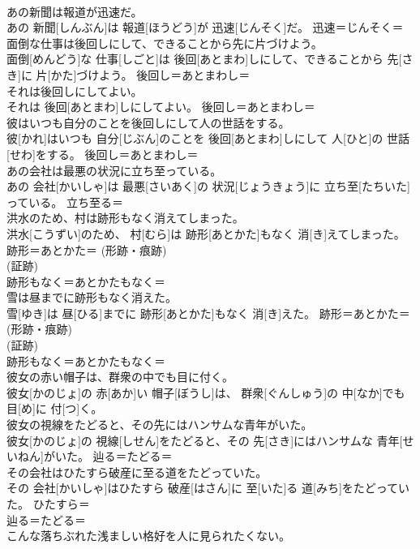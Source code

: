 \documentclass[8pt]{extreport}
\begin{document}
\begin{CJK}{UTF8}{min}
{\\	あの新聞は報道が迅速だ。	
\\	あの 新聞[しんぶん]は 報道[ほうどう]が 迅速[じんそく]だ。	迅速＝じんそく＝ 
\\	面倒な仕事は後回しにして、できることから先に片づけよう。	
\\	面倒[めんどう]な 仕事[しごと]は 後回[あとまわ]しにして、できることから 先[さき]に 片[かた]づけよう。	後回し＝あとまわし＝ 
\\	それは後回しにしてよい。	
\\	それは 後回[あとまわ]しにしてよい。	後回し＝あとまわし＝ 
\\	彼はいつも自分のことを後回しにして人の世話をする。	
\\	彼[かれ]はいつも 自分[じぶん]のことを 後回[あとまわ]しにして 人[ひと]の 世話[せわ]をする。	後回し＝あとまわし＝ 
\\	あの会社は最悪の状況に立ち至っている。	
\\	あの 会社[かいしゃ]は 最悪[さいあく]の 状況[じょうきょう]に 立ち至[たちいた]っている。	立ち至る＝ 
\\	洪水のため、村は跡形もなく消えてしまった。	
\\	洪水[こうずい]のため、 村[むら]は 跡形[あとかた]もなく 消[き]えてしまった。	跡形＝あとかた＝ (形跡・痕跡) 
\\	(証跡) 
\\	跡形もなく＝あとかたもなく＝ 
\\	雪は昼までに跡形もなく消えた。	
\\	雪[ゆき]は 昼[ひる]までに 跡形[あとかた]もなく 消[き]えた。	跡形＝あとかた＝ (形跡・痕跡) 
\\	(証跡) 
\\	跡形もなく＝あとかたもなく＝ 
\\	彼女の赤い帽子は、群衆の中でも目に付く。	
\\	彼女[かのじょ]の 赤[あか]い 帽子[ぼうし]は、 群衆[ぐんしゅう]の 中[なか]でも 目[め]に 付[つ]く。	
\\	彼女の視線をたどると、その先にはハンサムな青年がいた。	
\\	彼女[かのじょ]の 視線[しせん]をたどると、その 先[さき]にはハンサムな 青年[せいねん]がいた。	辿る＝たどる＝ 
\\	その会社はひたすら破産に至る道をたどっていた。	
\\	その 会社[かいしゃ]はひたすら 破産[はさん]に 至[いた]る 道[みち]をたどっていた。	ひたすら＝ 
\\	辿る＝たどる＝ 
\\	こんな落ちぶれた浅ましい格好を人に見られたくない。	
}
\end{CJK}
\end{document}
